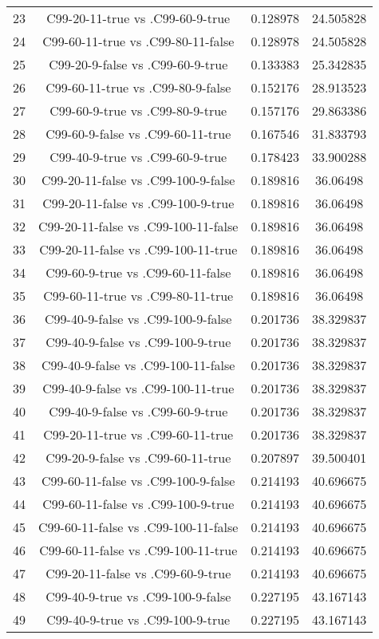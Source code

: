 \documentclass[a4paper,10pt]{article}
\begin{document}
\begin{landscape}
\begin{table}[!htp]
\begin{tabular}{cccc}
23&C99-20-11-true vs .C99-60-9-true&0.128978&24.505828\\
24&C99-60-11-true vs .C99-80-11-false&0.128978&24.505828\\
25&C99-20-9-false vs .C99-60-9-true&0.133383&25.342835\\
26&C99-60-11-true vs .C99-80-9-false&0.152176&28.913523\\
27&C99-60-9-true vs .C99-80-9-true&0.157176&29.863386\\
28&C99-60-9-false vs .C99-60-11-true&0.167546&31.833793\\
29&C99-40-9-true vs .C99-60-9-true&0.178423&33.900288\\
30&C99-20-11-false vs .C99-100-9-false&0.189816&36.06498\\
31&C99-20-11-false vs .C99-100-9-true&0.189816&36.06498\\
32&C99-20-11-false vs .C99-100-11-false&0.189816&36.06498\\
33&C99-20-11-false vs .C99-100-11-true&0.189816&36.06498\\
34&C99-60-9-true vs .C99-60-11-false&0.189816&36.06498\\
35&C99-60-11-true vs .C99-80-11-true&0.189816&36.06498\\
36&C99-40-9-false vs .C99-100-9-false&0.201736&38.329837\\
37&C99-40-9-false vs .C99-100-9-true&0.201736&38.329837\\
38&C99-40-9-false vs .C99-100-11-false&0.201736&38.329837\\
39&C99-40-9-false vs .C99-100-11-true&0.201736&38.329837\\
40&C99-40-9-false vs .C99-60-9-true&0.201736&38.329837\\
41&C99-20-11-true vs .C99-60-11-true&0.201736&38.329837\\
42&C99-20-9-false vs .C99-60-11-true&0.207897&39.500401\\
43&C99-60-11-false vs .C99-100-9-false&0.214193&40.696675\\
44&C99-60-11-false vs .C99-100-9-true&0.214193&40.696675\\
45&C99-60-11-false vs .C99-100-11-false&0.214193&40.696675\\
46&C99-60-11-false vs .C99-100-11-true&0.214193&40.696675\\
47&C99-20-11-false vs .C99-60-9-true&0.214193&40.696675\\
48&C99-40-9-true vs .C99-100-9-false&0.227195&43.167143\\
49&C99-40-9-true vs .C99-100-9-true&0.227195&43.167143\\

\end{tabular}
\end{table}
\end{landscape}
\end{document}
